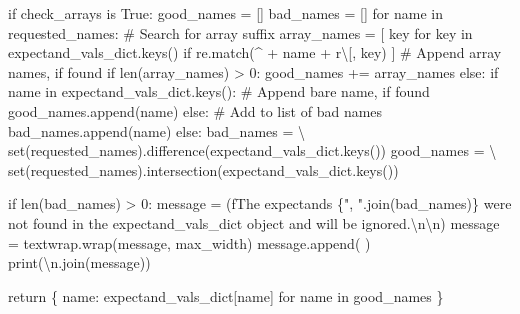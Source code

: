 \documentclass[
  letterpaper,
  DIV=11,
  numbers=noendperiod]{scrartcl}
\newenvironment{Shaded}{\begin{snugshade}}{\end{snugshade}}
\newcommand{\BuiltInTok}[1]{\textcolor[rgb]{0.00,0.23,0.31}{#1}}
\newcommand{\CharTok}[1]{\textcolor[rgb]{0.13,0.47,0.30}{#1}}
\newcommand{\CommentTok}[1]{\textcolor[rgb]{0.37,0.37,0.37}{#1}}
\newcommand{\ControlFlowTok}[1]{\textcolor[rgb]{0.00,0.23,0.31}{#1}}
\newcommand{\DecValTok}[1]{\textcolor[rgb]{0.68,0.00,0.00}{#1}}
\newcommand{\KeywordTok}[1]{\textcolor[rgb]{0.00,0.23,0.31}{#1}}
\newcommand{\NormalTok}[1]{\textcolor[rgb]{0.00,0.23,0.31}{#1}}
\newcommand{\OperatorTok}[1]{\textcolor[rgb]{0.37,0.37,0.37}{#1}}
\newcommand{\SpecialCharTok}[1]{\textcolor[rgb]{0.37,0.37,0.37}{#1}}
\newcommand{\SpecialStringTok}[1]{\textcolor[rgb]{0.13,0.47,0.30}{#1}}
\newcommand{\StringTok}[1]{\textcolor[rgb]{0.13,0.47,0.30}{#1}}
\newcommand{\VariableTok}[1]{\textcolor[rgb]{0.07,0.07,0.07}{#1}}
\newcommand{\VerbatimStringTok}[1]{\textcolor[rgb]{0.13,0.47,0.30}{#1}}
\begin{document}
\begin{Shaded}
\begin{Highlighting}[]
  \ControlFlowTok{if}\NormalTok{ check\_arrays }\KeywordTok{is} \VariableTok{True}\NormalTok{:}
\NormalTok{    good\_names }\OperatorTok{=}\NormalTok{ []}
\NormalTok{    bad\_names }\OperatorTok{=}\NormalTok{ []}
    \ControlFlowTok{for}\NormalTok{ name }\KeywordTok{in}\NormalTok{ requested\_names:}
      \CommentTok{\# Search for array suffix}
\NormalTok{      array\_names }\OperatorTok{=}\NormalTok{ [ key }\ControlFlowTok{for}\NormalTok{ key }\KeywordTok{in}\NormalTok{ expectand\_vals\_dict.keys()}
                      \ControlFlowTok{if}\NormalTok{ re.match(}\StringTok{\textquotesingle{}\^{}\textquotesingle{}} \OperatorTok{+}\NormalTok{ name }\OperatorTok{+} \VerbatimStringTok{r\textquotesingle{}\textbackslash{}[\textquotesingle{}}\NormalTok{, key) ]}
      \CommentTok{\# Append array names, if found}
      \ControlFlowTok{if} \BuiltInTok{len}\NormalTok{(array\_names) }\OperatorTok{\textgreater{}} \DecValTok{0}\NormalTok{:}
\NormalTok{        good\_names }\OperatorTok{+=}\NormalTok{ array\_names}
      \ControlFlowTok{else}\NormalTok{:}
        \ControlFlowTok{if}\NormalTok{ name }\KeywordTok{in}\NormalTok{ expectand\_vals\_dict.keys():}
          \CommentTok{\# Append bare name, if found}
\NormalTok{          good\_names.append(name)}
        \ControlFlowTok{else}\NormalTok{:}
          \CommentTok{\# Add to list of bad names}
\NormalTok{          bad\_names.append(name)}
  \ControlFlowTok{else}\NormalTok{:}
\NormalTok{    bad\_names }\OperatorTok{=} \OperatorTok{\textbackslash{}}
      \BuiltInTok{set}\NormalTok{(requested\_names).difference(expectand\_vals\_dict.keys())}
\NormalTok{    good\_names }\OperatorTok{=} \OperatorTok{\textbackslash{}}
      \BuiltInTok{set}\NormalTok{(requested\_names).intersection(expectand\_vals\_dict.keys())}
    
  \ControlFlowTok{if} \BuiltInTok{len}\NormalTok{(bad\_names) }\OperatorTok{\textgreater{}} \DecValTok{0}\NormalTok{:}
\NormalTok{    message }\OperatorTok{=}\NormalTok{ (}\SpecialStringTok{f\textquotesingle{}The expectands }\SpecialCharTok{\{}\StringTok{", "}\SpecialCharTok{.}\NormalTok{join(bad\_names)}\SpecialCharTok{\}}\SpecialStringTok{ \textquotesingle{}}
               \StringTok{\textquotesingle{}were not found in the \textasciigrave{}expectand\_vals\_dict\textasciigrave{} \textquotesingle{}}
               \StringTok{\textquotesingle{}object and will be ignored.}\CharTok{\textbackslash{}n\textbackslash{}n}\StringTok{\textquotesingle{}}\NormalTok{)}
\NormalTok{    message }\OperatorTok{=}\NormalTok{ textwrap.wrap(message, max\_width)}
\NormalTok{    message.append(}\StringTok{\textquotesingle{} \textquotesingle{}}\NormalTok{)}
    \BuiltInTok{print}\NormalTok{(}\StringTok{\textquotesingle{}}\CharTok{\textbackslash{}n}\StringTok{\textquotesingle{}}\NormalTok{.join(message))}
  
  \ControlFlowTok{return}\NormalTok{ \{ name: expectand\_vals\_dict[name] }\ControlFlowTok{for}\NormalTok{ name }\KeywordTok{in}\NormalTok{ good\_names \}}
\end{Highlighting}
\end{Shaded}
\end{document}
